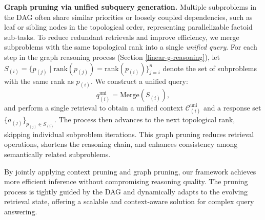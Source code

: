 \documentclass[letterpaper]{article} %
\begin{document}
\textbf{Graph pruning via unified subquery generation.} 
Multiple subproblems in the DAG often share similar priorities or loosely coupled dependencies, such as leaf or sibling nodes in the topological order, representing parallelizable factoid sub-tasks. To reduce redundant retrievals and improve efficiency, we merge subproblems with the same topological rank into a single \textit{unified query}. For each step in the graph reasoning process (Section \ref{linear-g-reasoning}), let $S_{(i)} = \{p_{(j)} \mid \text{rank}(p_{(j)}) = \text{rank}(p_{(i)})\}_{j=i}^n$ denote the set of subproblems with the same rank as $p_{(i)}$. We construct a unified query:
\begin{equation}
q^{\mathrm{uni}}_{(i)} = \mathrm{Merge}(S_{(i)}),
\label{eq:sub_query_gen}
\end{equation}
and perform a single retrieval to obtain a unified context $\mathcal{C}^{\mathrm{uni}}_{(i)}$ and a response set $\{a_{(j)}\}_{p_{(j)} \in S_{(i)}}$. The process then advances to the next topological rank, skipping individual subproblem iterations. This graph pruning reduces retrieval operations, shortens the reasoning chain, and enhances consistency among semantically related subproblems.


By jointly applying context pruning and graph pruning, our framework achieves more efficient inference without compromising reasoning quality. The pruning process is tightly guided by the DAG and dynamically adapts to the evolving retrieval state, offering a scalable and context-aware solution for complex query answering.
\end{document}
